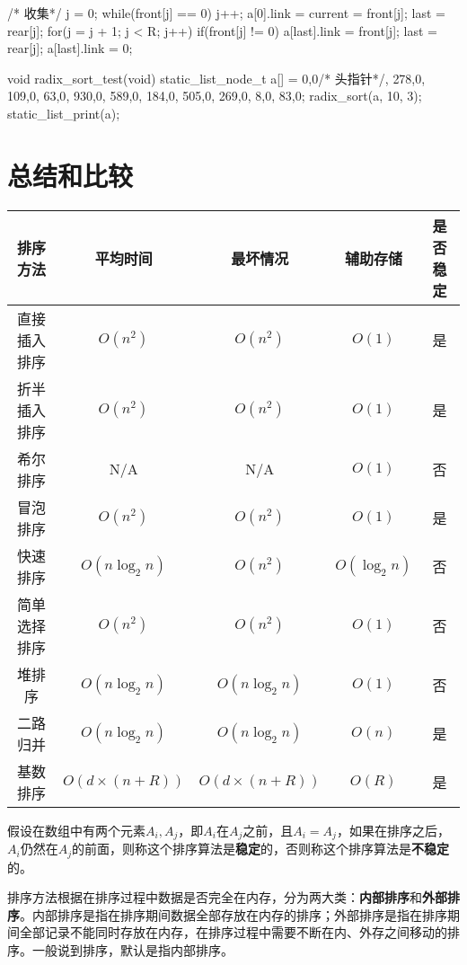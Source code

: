 \begin{Codex}[label=radix_sort.c]
{{        /* 收集*/
        j = 0;
        while(front[j] == 0) j++;
        a[0].link = current = front[j];
        last = rear[j];
        for(j = j + 1; j < R; j++) {
            if(front[j] != 0) {
                a[last].link = front[j];
                last = rear[j];
            }
        }
        a[last].link = 0;
    }
}

void radix_sort_test(void) {
    static_list_node_t a[] = {{0,0}/* 头指针*/, {278,0}, {109,0}, 
    {63,0}, {930,0}, {589,0}, {184,0}, {505,0}, {269,0}, 
    {8,0}, {83,0}};
    radix_sort(a, 10, 3);
    static_list_print(a);
}
\end{Codex}


\section{总结和比较} %

\begin{center}

\vspace{1ex}
\begin{tabular}{ccccc}
\hline
\textbf{排序方法} & \textbf{平均时间} & \textbf{最坏情况} & \textbf{辅助存储} & \textbf{是否稳定}\\
\hline
直接插入排序 & $O(n^2)$ & $O(n^2)$ & $O(1)$ & 是\\
折半插入排序 & $O(n^2)$ & $O(n^2)$ & $O(1)$ & 是\\
希尔排序 & N/A & N/A & $O(1)$ & 否\\
冒泡排序 & $O(n^2)$ & $O(n^2)$ & $O(1)$ & 是\\
快速排序 & $O(n\log_2n)$ & $O(n^2)$ & $O(\log_2n)$ & 否\\
简单选择排序 & $O(n^2)$ & $O(n^2)$ & $O(1)$ & 否\\
堆排序 & $O(n\log_2n)$ & $O(n\log_2n)$ & $O(1)$ & 否\\
二路归并 & $O(n\log_2n)$ & $O(n\log_2n)$ & $O(n)$ & 是\\
基数排序 & $O(d\times (n+R))$ & $O(d\times (n+R))$ & $O(R)$ & 是\\
\hline
\end{tabular}
\end{center}

假设在数组中有两个元素$A_i,A_j$，即$A_i$在$A_j$之前，且$A_i=A_j$，如果在排序之后，$A_i$仍然在$A_j$的前面，则称这个排序算法是\textbf{稳定}的，否则称这个排序算法是\textbf{不稳定}的。

排序方法根据在排序过程中数据是否完全在内存，分为两大类：\textbf{内部排序}和\textbf{外部排序}。内部排序是指在排序期间数据全部存放在内存的排序；外部排序是指在排序期间全部记录不能同时存放在内存，在排序过程中需要不断在内、外存之间移动的排序。一般说到排序，默认是指内部排序。

